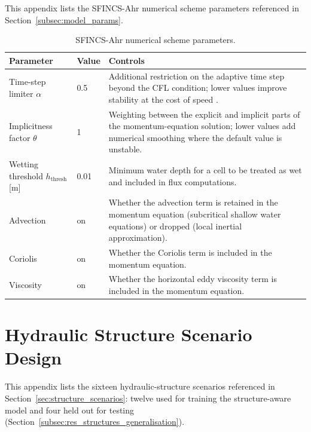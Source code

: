 \documentclass[12pt,a4paper]{report}
\begin{document}
{This appendix lists the SFINCS-Ahr numerical scheme parameters referenced in
Section~\ref{subsec:model_params}.

\begin{table}[H]
    \centering
    \caption{SFINCS-Ahr numerical scheme parameters.}
    \label{tab:app-sfincs-params}
    \begin{tabular}{llp{6.5cm}}
        \toprule
        Parameter & Value & Controls \\
        \midrule
        Time-step limiter $\alpha$ & 0.5 & Additional restriction on the adaptive time step beyond the CFL condition; lower values improve stability at the cost of speed \citep{leijnse2021sfincs}. \\
        Implicitness factor $\theta$ & 1 & Weighting between the explicit and implicit parts of the momentum-equation solution; lower values add numerical smoothing where the default value is unstable. \\
        Wetting threshold $h_\text{thresh}$ [m] & 0.01 & Minimum water depth for a cell to be treated as wet and included in flux computations. \\
        Advection & on & Whether the advection term is retained in the momentum equation (subcritical shallow water equations) or dropped (local inertial approximation). \\
        Coriolis & on & Whether the Coriolis term is included in the momentum equation. \\
        Viscosity & on & Whether the horizontal eddy viscosity term is included in the momentum equation. \\
        \bottomrule
    \end{tabular}
\end{table}

\chapter{Hydraulic Structure Scenario Design}
\label{app:structure_scenarios}

This appendix lists the sixteen hydraulic-structure scenarios referenced in
Section~\ref{sec:structure_scenarios}: twelve used for training the
structure-aware model and four held out for testing
(Section~\ref{subsec:res_structures_generalisation}).

}
\end{document}
